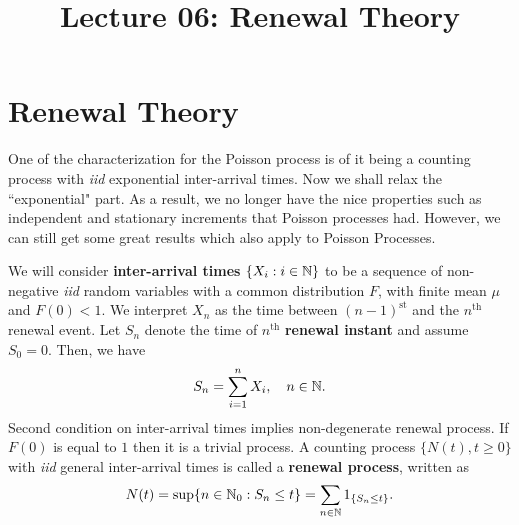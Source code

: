 \documentclass[a4paper,10pt, english]{article}
\title{Lecture 06: Renewal Theory}
\author{}
\begin{document}
\maketitle

\section{Renewal Theory}
One of the characterization for the Poisson process is of it being a counting process with \textit{iid} exponential inter-arrival times. 
Now we shall relax the ``exponential" part. 
As a result, we no longer have the nice properties such as independent and stationary increments that Poisson processes had. 
However, we can still get some great results which also apply to Poisson Processes. 

We will consider \textbf{inter-arrival times} $\{X_i: i \in \mathbb{N}\}$ to be a sequence of non-negative \textit{iid} random variables with a common distribution $F$, 
with finite mean $\mu$ and $F(0) < 1$. 
We interpret $X_n$ as the time between $(n - 1)^{\text{st}}$ and the $n^{\text{th}}$ renewal event. 
Let $S_n$ denote the time of $n^{\text{th}}$ \textbf{renewal instant} and assume $S_0 = 0$. 
Then, we have
\begin{align*} 
S_n = \sum_{i=1}^n X_i, \quad n\in \mathbb{N}. 
\end{align*}
Second condition on inter-arrival times implies non-degenerate renewal process. 
If $F(0)$ is equal to $1$ then it is a trivial process. 
A counting process $\{N(t),t \geq 0\}$ with \textit{iid} general inter-arrival times is called a \textbf{renewal process}, written as 
	\begin{align*} 
	N(t) = \sup\{n \in \mathbb{N}_0 : S_n \leq t\} = \sum_{n \in \mathbb{N}}1_{\{S_n \leq t\}}.
	\end{align*} 
\end{document}
